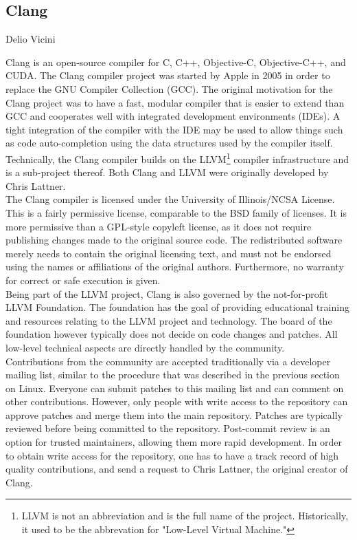 \subsection{Clang}{Delio Vicini}

Clang is an open-source compiler for C, C++, Objective-C, Objective-C++, and CUDA. The Clang compiler project was started by Apple in 2005 in order to replace the GNU Compiler Collection (GCC). The original motivation for the Clang project was to have a fast, modular compiler that is easier to extend than GCC and cooperates well with integrated development environments (IDEs).\cite{clang-motivation} A tight integration of the compiler with the IDE may be used to allow things such as code auto-completion using the data structures used by the compiler itself. Technically, the Clang compiler builds on the LLVM\footnote{LLVM is not an abbreviation and is the full name of the project. Historically, it used to be the abbrevation for "Low-Level Virtual Machine."} compiler infrastructure and is a sub-project thereof. Both Clang and LLVM were originally developed by Chris Lattner.\cite{lattner} \\

The Clang compiler is licensed under the University of Illinois/NCSA License.\cite{clang-policy} This is a fairly permissive license, comparable to the BSD family of licenses. It is more permissive than a GPL-style copyleft license, as it does not require publishing changes made to the original source code. The redistributed software merely needs to contain the original licensing text, and must not be endorsed using the names or affiliations of the original authors. Furthermore, no warranty for correct or safe execution is given.\cite{illinois-license} \\

Being part of the LLVM project, Clang is also governed by the not-for-profit LLVM Foundation. The foundation has the goal of providing educational training and resources relating to the LLVM project and technology.\cite{llvm-foundation} The board of the foundation however typically does not decide on code changes and patches. All low-level technical aspects are directly handled by the community.\cite{clang-policy} \\

Contributions from the community are accepted traditionally via a developer mailing list, similar to the procedure that was described in the previous section on Linux. Everyone can submit patches to this mailing list and can comment on other contributions. However, only people with write access to the repository can approve patches and merge them into the main repository. Patches are typically reviewed before being committed to the repository. Post-commit review is an option for trusted maintainers, allowing them more rapid development. In order to obtain write access for the repository, one has to have a track record of high quality contributions, and send a request to Chris Lattner, the original creator of Clang. \\


